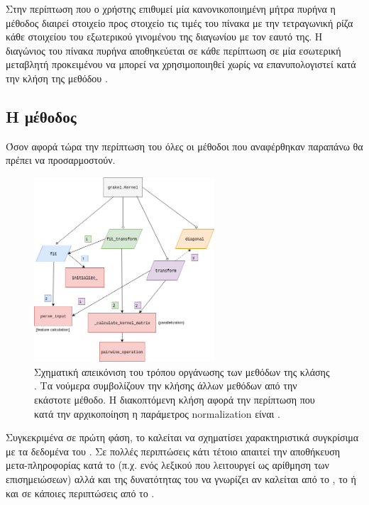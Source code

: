 Στην περίπτωση που ο χρήστης επιθυμεί μία κανονικοποιημένη μήτρα πυρήνα η μέθοδος \texttt{} διαιρεί στοιχείο προς στοιχείο τις τιμές του πίνακα με την τετραγωνική ρίζα κάθε στοιχείου του εξωτερικού γινομένου της διαγωνίου με τον εαυτό της.
Η διαγώνιος του πίνακα πυρήνα αποθηκεύεται σε κάθε περίπτωση σε μία εσωτερική μεταβλητή προκειμένου να μπορεί να χρησιμοποιηθεί χωρίς να επανυπολογιστεί κατά την κλήση της μεθόδου \texttt{}.
\subsection{Η μέθοδος \texttt{}}
Όσον αφορά τώρα την περίπτωση του \texttt{} όλες οι μέθοδοι που αναφέρθηκαν παραπάνω θα πρέπει να προσαρμοστούν.
\begin{figure}[]
    \centering
    \includegraphics[width=0.6\textwidth]{figures/KernelStructure.png}
    \caption[Σχηματική απεικόνιση του τρόπου οργάνωσης των μεθόδων της κλάσης .]{Σχηματική απεικόνιση του τρόπου οργάνωσης των μεθόδων της κλάσης . Τα νούμερα συμβολίζουν την κλήσης άλλων μεθόδων από την εκάστοτε μέθοδο. Η διακοπτόμενη κλήση αφορά την περίπτωση που κατά την αρχικοποίηση η παράμετρος normalization είναι .}
    \label{fig:kernel_structure}
\end{figure}
Συγκεκριμένα σε πρώτη φάση, το \texttt{} καλείται να σχηματίσει χαρακτηριστικά συγκρίσιμα με τα δεδομένα του \texttt{}.
Σε πολλές περιπτώσεις κάτι τέτοιο απαιτεί την αποθήκευση μετα-πληροφορίας κατά το \texttt{} (π.χ. ενός λεξικού που λειτουργεί ως αρίθμηση των επισημειώσεων) αλλά και της δυνατότητας του \texttt{} να γνωρίζει αν καλείται από το \texttt{}, το \texttt{} ή και σε κάποιες περιπτώσεις από το \texttt{}.

